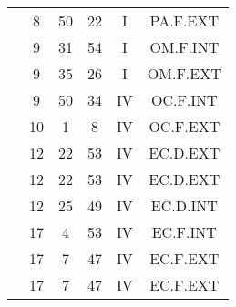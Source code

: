 \documentclass[12pt, a4paper]{article}
\begin{document}
\begin{multicols}{3}
{\begin{tabular}{c c c c c c}
	 	 	 	 & 8 & 50 & 22 & I & PA.F.EXT\\%
	 	 	 	 & 9 & 31 & 54 & I & OM.F.INT\\%
	 	 	 	 & 9 & 35 & 26 & I & OM.F.EXT\\%
	 	 	 	 & 9 & 50 & 34 & IV & OC.F.INT\\%
	 	 	 	 & 10 & 1 & 8 & IV & OC.F.EXT\\%
	 	 	 	 & 12 & 22 & 53 & IV & EC.D.EXT\\%
	 	 	 	 & 12 & 22 & 53 & IV & EC.D.EXT\\%
	 	 	 	 & 12 & 25 & 49 & IV & EC.D.INT\\%
	 	 	 	 & 17 & 4 & 53 & IV & EC.F.INT\\%
	 	 	 	 & 17 & 7 & 47 & IV & EC.F.EXT\\%
	 	 	 	 & 17 & 7 & 47 & IV & EC.F.EXT\\%
	 	 \end{tabular}
 	}
\end{multicols}
\end{document}
